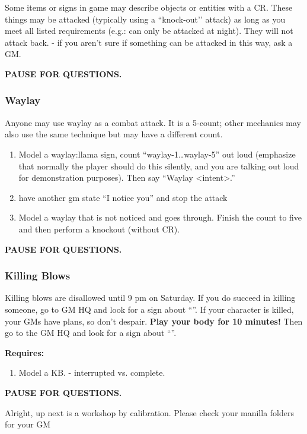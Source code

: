 \documentclass[green]{GL2020}
\begin{document}
Some items or signs in game may describe objects or entities with a CR. These things may be attacked (typically using a ``knock-out’’ attack) as long as you meet all listed requirements (e.g.: can only be attacked at night). They will not attack back. - if you aren’t sure if something can be attacked in this way, ask a GM.


\textbf{PAUSE FOR QUESTIONS.}

\subsubsection*{Waylay}
Anyone may use waylay as a combat attack. It is a 5-count; other mechanics may also use the same technique but may have a different count.
\begin{enumerate}
	\item Model a waylay:llama sign, count ``waylay-1\ldots waylay-5'' out loud (emphasize that normally the player should do this silently, and you are talking out loud for demonstration purposes). Then say ``Waylay <intent>.''
	\item have another gm state “I notice you” and stop the attack
	\item Model a waylay that is not noticed and goes through.  Finish the count to five and then perform a knockout (without CR).

\end{enumerate}

\textbf{PAUSE FOR QUESTIONS.}

\subsubsection*{Killing Blows}
Killing blows are disallowed until 9 pm on Saturday. If you do succeed in killing someone, go to GM HQ and look for a sign about ``\sMurderConsequences{}''. If your character is killed, your GMs have plans, so don’t despair. \textbf{Play your body for 10 minutes!} Then go to the GM HQ and look for a sign about ``\sMurdered{}''.

\textbf{Requires:}
\begin{enumerate}
	
	\item Model a KB. - interrupted vs. complete.
\end{enumerate}

\textbf{PAUSE FOR QUESTIONS.}

Alright, up next is a workshop by calibration. Please check your manilla folders for your GM
\end{document}
